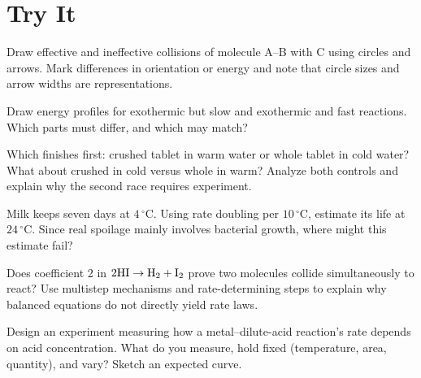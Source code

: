 \section*{Try It}

\begin{sikaoti}
\item Draw effective and ineffective collisions of molecule A--B with C using circles and arrows. Mark differences in orientation or energy and note that circle sizes and arrow widths are representations.
\item Draw energy profiles for exothermic but slow and exothermic and fast reactions. Which parts must differ, and which may match?
\item Which finishes first: crushed tablet in warm water or whole tablet in cold water? What about crushed in cold versus whole in warm? Analyze both controls and explain why the second race requires experiment.
\item Milk keeps seven days at $4\,^{\circ}\mathrm{C}$. Using rate doubling per $10\,^{\circ}\mathrm{C}$, estimate its life at $24\,^{\circ}\mathrm{C}$. Since real spoilage mainly involves bacterial growth, where might this estimate fail?
\item Does coefficient 2 in $\mathrm{2HI} \rightarrow \mathrm{H_2} + \mathrm{I_2}$ prove two  molecules collide simultaneously to react? Use multistep mechanisms and rate-determining steps to explain why balanced equations do not directly yield rate laws.
\item Design an experiment measuring how a metal--dilute-acid reaction's rate depends on acid concentration. What do you measure, hold fixed (temperature, area, quantity), and vary? Sketch an expected curve.
\end{sikaoti}
